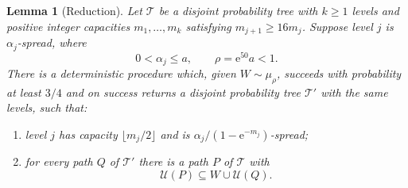 \documentclass[11pt]{article}
\newtheorem{lemma}[theorem]{Lemma}
\numberwithin{equation}{section}
\newcommand{\TT}{\mathcal T}
\newcommand{\UU}{\mathcal U}
\newcommand{\ee}{\mathrm e}
\begin{document}
\begin{lemma}[Reduction]\label{lem:reduction}
Let $\TT$ be a disjoint probability tree with $k\ge1$ levels and positive integer
capacities $m_1,\ldots,m_k$ satisfying $m_{j+1}\ge16m_j$.
Suppose level $j$ is $\alpha_j$-spread, where
\[
 0<\alpha_j\le a,\qquad \rho=\ee^{50}a<1.
\]
There is a deterministic procedure which, given $W\sim\mu_\rho$,
succeeds with probability at least $3/4$ and on success returns a
disjoint probability tree $\TT'$ with the same levels, such that:
\begin{enumerate}[label=(\roman*),leftmargin=2.2em,itemsep=3pt]
 \item level $j$ has capacity $\lfloor m_j/2\rfloor$ and is
 $\alpha_j/(1-\ee^{-m_j})$-spread;
 \item for every path $Q$ of $\TT'$ there is a path $P$ of $\TT$ with
 \begin{equation}\label{eq:recovery}
   \UU(P)\subseteq W\cup\UU(Q).
 \end{equation}
\end{enumerate}
\end{lemma}
\end{document}

